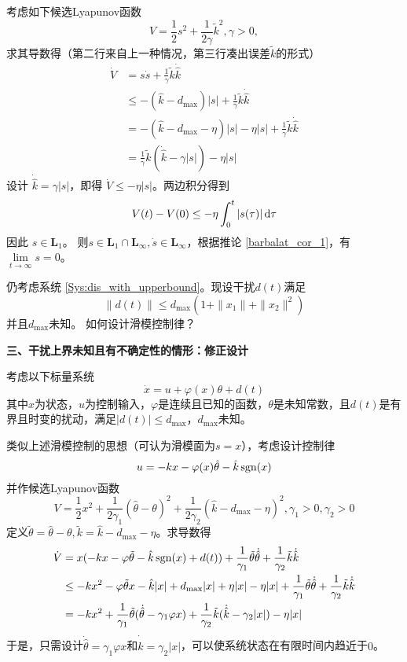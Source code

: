   考虑如下候选Lyapunov函数
  \[ V = \frac{1}{2} s^2 + \frac{1}{2 \gamma} \tilde{k}^2, \gamma > 0, \]
  求其导数得（第二行来自上一种情况，第三行凑出误差$\tilde{k}$的形式）
  \begin{align*}
    \dot{V} & = s  \dot{s} + \frac{1}{\gamma} \tilde{k} \dot{\hat{k}}\\
    & \leq - (\hat{k} - d_{\max}) | s | + \frac{1}{\gamma} \tilde{k}
    \dot{\hat{k}}\\
    & = - (\hat{k} - d_{\max} - \eta) | s | - \eta | s | + \frac{1}{\gamma}
    \tilde{k} \dot{\hat{k}}\\
    & = \frac{1}{\gamma} \tilde{k} (\dot{\hat{k}} - \gamma | s |) - \eta | s |
  \end{align*}
  设计 $\dot{\hat{k}} = \gamma | s |$，即得 $\dot{V} \leq - \eta | s |$。两边积分得到
  \[ V (t) - V (0) \leq - \eta \int^t_0 | s(\tau) | \mathop{}\!\mathrm{d} \tau \]
  因此 $s \in \mathbf{L}_1$。
  则$s \in \mathbf{L}_1 \cap \mathbf{L}_{\infty}, \dot{s} \in
  \mathbf{L}_{\infty}$，根据推论 \ref{barbalat_cor_1}，有 $\lim\limits_{t \rightarrow \infty} s = 0$。
\begin{problem}\label{Pro:dis_with_unknown_upperbound}
    仍考虑系统 \eqref{Sys:dis_with_upperbound}。现设干扰$d(t)$满足
  \[ \| d (t) \| \leq d_{\max} (1 + \| x_1 \| + \| x_2 \|^2) \]
并且$d_{\max}$未知。
如何设计滑模控制律？
\end{problem}

\noindent\textbf{三、干扰上界未知且有不确定性的情形：修正设计}

考虑以下标量系统
\begin{equation}
    \dot{x} = u + \varphi(x)\theta + d(t)
\end{equation}
其中$x$为状态，$u$为控制输入，$\varphi$是连续且已知的函数，$\theta$是未知常数，且$d(t)$是有界且时变的扰动，满足$|d(t)|\le d_{\max}$，$d_{\max}$未知。

类似上述滑模控制的思想（可认为滑模面为$s=x$），考虑设计控制律\[u=-kx-\varphi(x)\hat{\theta}-\hat{k}\operatorname{sgn}(x)\]
并作候选Lyapunov函数\[V=\frac{1}{2}x^2+\frac{1}{2\gamma_1}(\hat{\theta}-\theta)^2+\frac{1}{2\gamma_2}(\hat{k}-d_{\max}-\eta)^2,\gamma_1>0,\gamma_2>0\]
定义$\tilde{\theta}=\hat{\theta}-\theta,\tilde{k}=\hat{k}-d_{\max}-\eta$。求导数得
\begin{align*}
    \dot{V}&=x(-kx-\varphi\tilde{\theta}-\hat{k}\operatorname{sgn}(x)+d(t))+\frac{1}{\gamma_1}\tilde{\theta}\dot{\hat{\theta}}+\frac{1}{\gamma_2}\tilde{k}\dot{\hat{k}}\\
    &\leq -kx^2-\varphi\tilde{\theta}x-\hat{k}|x|+d_{\max}|x|+\eta|x|-\eta|x|+\frac{1}{\gamma_1}\tilde{\theta}\dot{\hat{\theta}}+\frac{1}{\gamma_2}\tilde{k}\dot{\hat{k}}\\
    &=-kx^2+\frac{1}{\gamma_1}\tilde{\theta}(\dot{\hat{\theta}}-\gamma_1\varphi x)+\frac{1}{\gamma_2}\tilde{k}(\dot{\hat{k}}-\gamma_2|x|)-\eta|x|
\end{align*}
于是，只需设计$\dot{\hat{\theta}}=\gamma_1\varphi x$和$\dot{\hat{k}}=\gamma_2|x|$，可以使系统状态在有限时间内趋近于$0$。

